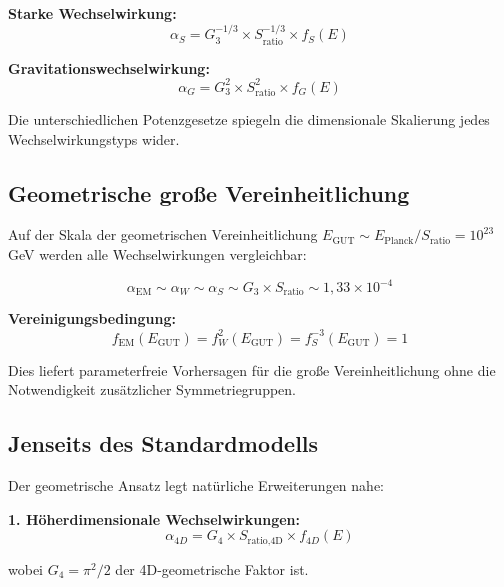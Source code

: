 \documentclass[12pt,a4paper]{report}
\begin{document}
	\textbf{Starke Wechselwirkung:}
	\begin{equation}
		\alpha_S = G_3^{-1/3} \times S_{\text{ratio}}^{-1/3} \times f_S(E)
	\end{equation}
	
	\textbf{Gravitationswechselwirkung:}
	\begin{equation}
		\alpha_G = G_3^2 \times S_{\text{ratio}}^2 \times f_G(E)
	\end{equation}
	
	Die unterschiedlichen Potenzgesetze spiegeln die dimensionale Skalierung jedes Wechselwirkungstyps wider.
	
	\subsection{Geometrische große Vereinheitlichung}
	\label{subsec:geometric_grand_unification}
	
	Auf der Skala der geometrischen Vereinheitlichung $E_{\text{GUT}} \sim E_{\text{Planck}}/S_{\text{ratio}} = 10^{23}$ GeV werden alle Wechselwirkungen vergleichbar:
	
	\begin{equation}
		\alpha_{\text{EM}} \sim \alpha_W \sim \alpha_S \sim G_3 \times S_{\text{ratio}} \sim 1,33 \times 10^{-4}
	\end{equation}
	
	\textbf{Vereinigungsbedingung:}
	\begin{equation}
		f_{\text{EM}}(E_{\text{GUT}}) = f_W^2(E_{\text{GUT}}) = f_S^{-3}(E_{\text{GUT}}) = 1
	\end{equation}
	
	Dies liefert parameterfreie Vorhersagen für die große Vereinheitlichung ohne die Notwendigkeit zusätzlicher Symmetriegruppen.
	
	\subsection{Jenseits des Standardmodells}
	\label{subsec:beyond_standard_model}
	
	Der geometrische Ansatz legt natürliche Erweiterungen nahe:
	
	\textbf{1. Höherdimensionale Wechselwirkungen:}
	\begin{equation}
		\alpha_{4D} = G_4 \times S_{\text{ratio,4D}} \times f_{4D}(E)
	\end{equation}
	
	wobei $G_4 = \pi^2/2$ der 4D-geometrische Faktor ist.
	
\end{document}
